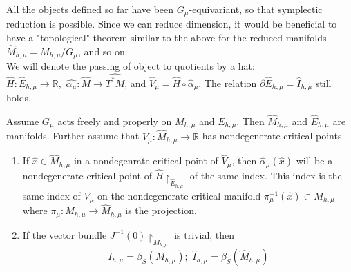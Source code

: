 \indent All the objects defined so far have been $G_{\mu}$-equivariant, so that symplectic reduction is possible. Since we can reduce dimension, it would be beneficial to have a "topological" theorem similar to the above for the reduced manifolds $\widehat{M}_{h,\mu}=M_{h,\mu}/G_{\mu}$, and so on. \\
\indent We will denote the passing of object to quotients by a hat: $\widehat{H}: \widehat{E}_{h,\mu} \to \mathbb{R}, \hspace{4pt} \widehat{\alpha_{\mu}}:\widehat{M} \to \widehat{T^*M}$, and $\widehat{V}_{\mu}= \widehat{H}\circ \widehat{\alpha}_{\mu}$. The relation $\partial \widehat{E}_{h,\mu}=\widehat{I}_{h,\mu}$ still holds.

\begin{thm}
Assume $G_{\mu}$ acts freely and properly on $M_{h,\mu}$ and $E_{h,\mu}$. Then $\widehat{M}_{h,\mu}$ and $\widehat{E}_{h,\mu}$ are manifolds. Further assume that $\widehat{V}_{\mu}:\widehat{M}_{h,\mu}\to \mathbb{R}$ has nondegenerate critical points.
\begin{enumerate}
    \item If $\widehat{x} \in \widehat{M}_{h,\mu}$ in a nondegenrate critical point of $\widehat{V}_{\mu}$, then $\widehat{\alpha}_{\mu}(\widehat{x})$ will be a nondegenerate critical point of $\widehat{H} \restriction_{\widehat{E}_{h,\mu}}$ of the same index. This index is the same index of $V_{\mu}$ on the nondegenerate critical manifold $\pi_{\mu}^{-1}(\widehat{x}) \subset M_{h,\mu}$ where $\pi_{\mu}:M_{h,\mu} \to \widehat{M}_{h,\mu}$ is the projection. 
    \item If the vector bundle $J^{-1}(0) \restriction_{M_{h,\mu}}$ is trivial, then
    \begin{equation}
        I_{h,\mu} = \beta_S(M_{h,\mu}); \hspace{4pt} \widehat{I}_{h,\mu}=\beta_S (\widehat{M}_{h,\mu})
    \end{equation}
\end{enumerate}
\end{thm}

